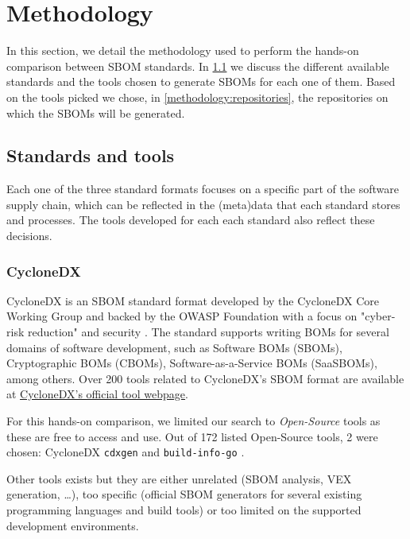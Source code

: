 \section{Methodology}

In this section, we detail the methodology used to perform the hands-on comparison between SBOM standards. In \ref{methodology:standards-tools} we discuss the different available standards and the tools chosen to generate SBOMs for each one of them. Based on the tools picked we chose, in \ref{methodology:repositories}, the repositories on which the SBOMs will be generated.

\subsection{Standards and tools} \label{methodology:standards-tools}

Each one of the three standard formats focuses on a specific part of the software supply chain, which can be reflected in the (meta)data that each standard stores and processes. The tools developed for each each standard also reflect these decisions. 

\subsubsection{CycloneDX}

CycloneDX \cite{standards:sbom:cyclonedx} is an SBOM standard format developed by the CycloneDX Core Working Group and backed by the OWASP Foundation with a focus on "cyber-risk reduction" \cite{standards:sbom:cyclonedx} and security \cite{article:sbom-study}. The standard supports writing BOMs for several domains of software development, such as Software BOMs (SBOMs), Cryptographic BOMs (CBOMs), Software-as-a-Service BOMs (SaaSBOMs), among others. Over 200 tools related to CycloneDX's SBOM format are available at \href{https://cyclonedx.org/tool-center/}{\underline{CycloneDX's official tool webpage}}. 

For this hands-on comparison, we limited our search to \emph{Open-Source} tools as these are free to access and use. Out of 172 listed Open-Source tools, 2 were chosen: CycloneDX \verb|cdxgen|\cite{repository:cyclonedx:cdxgen} and \verb|build-info-go| \cite{repository:cyclonedx:build-info-go}.

Other tools exists but they are either unrelated (SBOM analysis, VEX generation, \dots), too specific (official SBOM generators for several existing programming languages and build tools) or too limited on the supported development environments.

